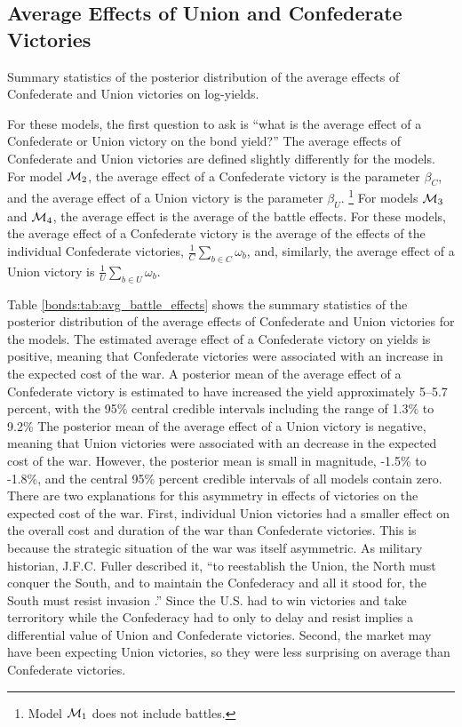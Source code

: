 \subsection{Average Effects of Union and Confederate Victories}
\label{sec:future-battles}

\begin{table}
  \centering
  
  \caption{Summary statistics of the posterior distribution of the average effects of Confederate and Union victories on log-yields.}
  \label{bonds:tab:avg_battle_effects}
\end{table}

For these models, the first question to ask is ``what is the average effect of a Confederate or Union victory on the bond yield?''
The average effects of Confederate and Union victories are defined slightly differently for the models.
For model $\mathcal{M}_{\text{2}}$, the average effect of a Confederate victory is the parameter $\beta_{C}$, and the average effect of a Union victory is the parameter $\beta_{U}$.%
\footnote{Model $\mathcal{M}_{\text{1}}$ does not include battles.}
For models $\mathcal{M}_{\text{3}}$ and $\mathcal{M}_{\text{4}}$, the average effect is the average of the battle effects.
For these models, the average effect of a Confederate victory is the average of the effects of the individual Confederate victories, $\frac{1}{C}\sum_{b \in C} \omega_{b}$, and, similarly, the average effect of a Union victory is $\frac{1}{U}\sum_{b \in U} \omega_{b}$.

Table \ref{bonds:tab:avg_battle_effects} shows the summary statistics of the posterior distribution of the average effects of Confederate and Union victories for the models.
The estimated average effect of a Confederate victory on yields is positive, meaning that Confederate victories were associated with an increase in the expected cost of the war.
A posterior mean of the average effect of a Confederate victory is estimated to have increased the yield approximately 5--5.7 percent, with the 95\% central credible intervals including the range of 1.3\% to 9.2\%
The posterior mean of the average effect of a Union victory is negative, meaning that Union victories were associated with an decrease in the expected cost of the war.
However, the posterior mean is small in magnitude, -1.5\% to -1.8\%, and the central 95\% percent credible intervals of all models contain zero.
There are two explanations for this asymmetry in effects of victories on the expected cost of the war.
First, individual Union victories had a smaller effect on the overall cost and duration of the war than Confederate victories.
This is because the strategic situation of the war was itself asymmetric. 
As military historian, J.F.C. Fuller described it, ``to reestablish the Union, the North must conquer the South, and to maintain the Confederacy and all it stood for, the South must resist invasion \parencite[177]{Fuller1942a}.'' 
Since the U.S. had to win victories and take terroritory while the Confederacy had to only to delay and resist implies a differential value of Union and Confederate victories.
Second, the market may have been expecting Union victories, so they were less surprising on average than Confederate victories.


